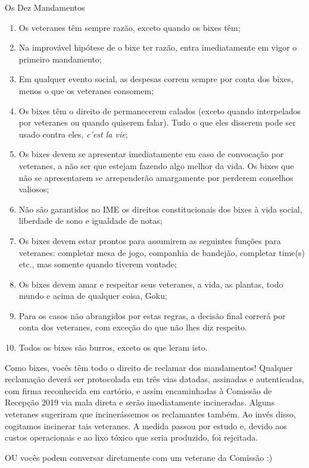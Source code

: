 \begin{editorial}{Os Dez Mandamentos}

\begin{enumerate}
  \item Os veteranes têm sempre razão, exceto quando os bixes têm;
  \item Na improvável hipótese de o bixe ter razão, entra imediatamente em vigor
        o primeiro mandamento;
  \item Em qualquer evento social, as despesas correm sempre por conta dos
        bixes, menos o que os veteranes consomem;
  \item Os bixes têm o direito de permanecerem calados (exceto quando
        interpelados por veteranes ou quando quiserem falar). Tudo o que eles
        disserem pode ser usado contra eles, \textit{c’est la vie};
  \item Os bixes devem se apresentar imediatamente em caso de convocação por
        veteranes, a não ser que estejam fazendo algo melhor da vida. Os bixes
        que não se apresentarem se arrependerão amargamente por perderem
        conselhos valiosos; %
  \item Não são garantidos no IME os direitos constitucionais dos bixes à vida
        social, liberdade de sono e igualdade de notas;
  \item Os bixes devem estar prontos para assumirem as seguintes funções para
        veteranes: completar mesa de jogo, companhia de bandejão, completar
        time(s) etc., mas somente quando tiverem vontade;
  \item Os bixes devem amar e respeitar seus veteranes, a vida, as plantas,
        todo mundo e acima de qualquer coisa, Goku;
  \item Para os casos não abrangidos por estas regras, a decisão final correrá
        por conta dos veteranes, com exceção do que não lhes diz respeito.
  \item Todos os bixes são burros, exceto os que leram isto.
\end{enumerate}

Como bixes, vocês têm todo o direito de reclamar dos mandamentos! Qualquer
reclamação deverá ser protocolada em três vias datadas, assinadas e
autenticadas, com firma reconhecida em cartório, e assim encaminhadas à
Comissão de Recepção 2019 %
via mala direta e serão imediatamente incineradas. Alguns veteranes sugeriram
que incinerássemos os reclamantes também. Ao invés disso, cogitamos incinerar
tais veteranes. A medida passou por estudo e, devido aos custos operacionais e
ao lixo tóxico que seria produzido, foi rejeitada.

OU vocês podem conversar diretamente com um veterane da Comissão :)

\end{editorial}
